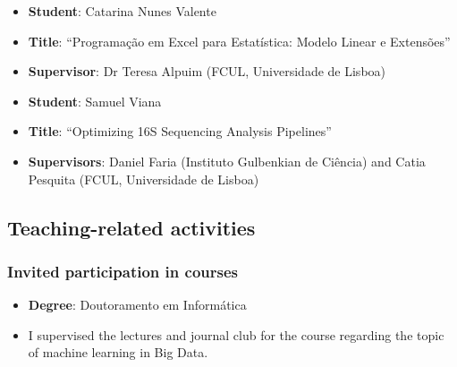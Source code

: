 \begin{itemize}
    \item \textbf{Student}: Catarina Nunes Valente
    \item \textbf{Title}: ``Programação em Excel para Estatística: Modelo Linear e Extensões''
    \item \textbf{Supervisor}: Dr Teresa Alpuim (FCUL, Universidade de Lisboa)
\end{itemize}

\begin{itemize}
    \item \textbf{Student}: Samuel Viana
    \item \textbf{Title}: ``Optimizing 16S Sequencing Analysis Pipelines''
    \item \textbf{Supervisors}: Daniel Faria (Instituto Gulbenkian de Ciência) and Catia Pesquita (FCUL, Universidade de Lisboa)
\end{itemize}


\subsection{Teaching-related activities}

\subsubsection{Invited participation in courses}

\begin{itemize}
    \item \textbf{Degree}: Doutoramento em Informática
    \item I supervised the lectures and journal club for the course regarding the topic of machine learning in Big Data.
\end{itemize}


